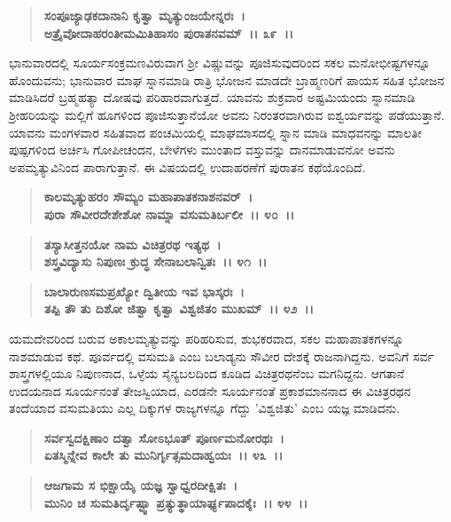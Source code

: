 \begin{verse}
\textbf{ಸಂಪೂಜ್ಯಾಢಕದಾನಾನಿ ಕೃತ್ವಾ ಮೃತ್ಯುಂಜಯೇನ್ನರಃ~।}\\\textbf{ಅತ್ರೈವೋದಾಹರಂತೀಮಮಿತಿಹಾಸಂ ಪುರಾತನವಮ್~।। ೩೯~।।}
\end{verse}

ಭಾನುವಾರದಲ್ಲಿ ಸೂರ್ಯಸಂಕ್ರಮಣವಿರುವಾಗ ಶ‍್ರೀ ವಿಷ್ಣುವನ್ನು ಪೂಜಿಸುವುದರಿಂದ ಸಕಲ ಮನೋಭೀಷ್ಟಗಳನ್ನೂ ಹೊಂದುವನು; ಭಾನುವಾರ ಮಾಘ ಸ್ನಾನಮಾಡಿ ರಾತ್ರಿ ಭೋಜನ ಮಾಡದೇ ಬ್ರಾಹ್ಮಣರಿಗೆ ಪಾಯಸ ಸಹಿತ ಭೋಜನ ಮಾಡಿಸಿದರೆ ಬ್ರಹ್ಮಹತ್ಯಾ ದೋಷವು ಪರಿಹಾರವಾಗುತ್ತದೆ. ಯಾವನು ಶುಕ್ರವಾರ ಅಷ್ಟಮಿಯಂದು ಸ್ನಾನಮಾಡಿ ಶ‍್ರೀಹರಿಯನ್ನು ಮಲ್ಲಿಗೆ ಹೂಗಳಿಂದ ಪೂಜಿಸುತ್ತಾನೆಯೋ ಅವನು ನಿರಂತರವಾಗಿರುವ ಐಶ್ವರ್ಯವನ್ನು ಪಡೆಯುತ್ತಾನೆ. ಯಾವನು ಮಂಗಳವಾರ ಸಹಿತವಾದ ಪಂಚಮಿಯಲ್ಲಿ ಮಾಘಮಾಸದಲ್ಲಿ ಸ್ನಾನ ಮಾಡಿ ಮಾಧವನನ್ನು ಮಾಲತೀ ಪುಷ್ಪಗಳಿಂದ ಅರ್ಚಿಸಿ ಗೋಪೀಚಂದನ, ಬೇಳೆಗಳು ಮುಂತಾದ ವಸ್ತುವನ್ನು ದಾನಮಾಡುವನೋ ಅವನು ಅಪಮೃತ್ಯುವಿನಿಂದ ಪಾರಾಗುತ್ತಾನೆ. ಈ ವಿಷಯದಲ್ಲಿ ಉದಾಹರಣೆಗೆ ಪುರಾತನ ಕಥೆಯೊಂದಿದೆ.

\begin{verse}
\textbf{ಕಾಲಮೃತ್ಯುಹರಂ ಸೌಮ್ಯಂ ಮಹಾಪಾತಕನಾಶನವರ್~।}\\\textbf{ಪುರಾ ಸೌವೀರದೇಶೇಶೋ ನಾಮ್ನಾ ವಸುಮತಿರ್ಬಲೀ~।। ೪೦~।। }
\end{verse}

\begin{verse}
\textbf{ತಸ್ಯಾಸೀತ್ತನಯೋ ನಾಮ ವಿಚಿತ್ರರಥ ಇತ್ಯಥ~।}\\\textbf{ಶಸ್ತ್ರವಿದ್ಯಾಸು ನಿಪುಣಃ ಕ್ರುದ್ಧ ಸೇನಾಬಲಾನ್ವಿತಃ~।। ೪೧~।।}
\end{verse}

\begin{verse}
\textbf{ಬಾಲಾರುಣಸಮಪ್ರಖ್ಯೋ ದ್ವಿತೀಯ ಇವ ಭಾಸ್ಕರಃ~।}\\\textbf{ತಪ್ಪಿ ತೌ ತು ದಿಶೋ ಜಿತ್ವಾ ಕೃತ್ವಾ ವಿಶ್ವಜಿತಂ ಮುಖಮ್~।। ೪೨~।।}
\end{verse}

ಯಮದೇವರಿಂದ ಬರುವ ಅಕಾಲಮೃತ್ಯುವನ್ನು ಪರಿಹರಿಸುವ, ಶುಭಕರವಾದ, ಸಕಲ ಮಹಾಪಾತಕಗಳನ್ನೂ ನಾಶಮಾಡುವ ಕಥೆ. ಪೂರ್ವದಲ್ಲಿ ವಸುಮತಿ ಎಂಬ ಬಲಾಡ್ಯನು ಸೌವೀರ ದೇಶಕ್ಕೆ ರಾಜನಾಗಿದ್ದನು. ಅವನಿಗೆ ಸರ್ವ ಶಾಸ್ತ್ರಗಳಲ್ಲಿಯೂ ನಿಪುಣನಾದ, ಒಳ್ಳೆಯ ಸೈನ್ಯಬಲದಿಂದ ಕೂಡಿದ ವಿಚಿತ್ರರಥನೆಂಬ ಮಗನಿದ್ದನು. ಆಗತಾನೆ ಉದಯನಾದ ಸೂರ್ಯನಂತೆ ತೇಜಸ್ವಿಯಾದ, ಎರಡನೇ ಸೂರ್ಯನಂತೆ ಪ್ರಕಾಶಮಾನನಾದ ಈ ವಿಚಿತ್ರರಥನ ತಂದೆಯಾದ ವಸುಮತಿಯು ಎಲ್ಲ ದಿಕ್ಕುಗಳ ರಾಜ್ಯಗಳನ್ನೂ ಗೆದ್ದು 'ವಿಶ್ವಜಿತು' ಎಂಬ ಯಜ್ಞ ಮಾಡಿದನು.

\begin{verse}
\textbf{ಸರ್ವಸ್ವದಕ್ಷಿಣಾಂ ದತ್ವಾ ಸೋಽಭೂತ್ ಪೂರ್ಣಮನೋರಥಃ~।}\\\textbf{ಏತಸ್ಮಿನ್ನೇವ ಕಾಲೇ ತು ಮುನಿರ್ಗೃತ್ಸಮದಾಹ್ವಯಃ~।। ೪೩~।। }
\end{verse}

\begin{verse}
\textbf{ಆಜಗಾಮ ಸ ಭಿಕ್ಷಾಯೈ ಯಜ್ಞ ಸ್ವಾಧ್ವರದೀಕ್ಷಿತಃ~।}\\\textbf{ಮುನಿಂ ಚ ಸುಮತಿರ್ದೃಷ್ಟ್ವಾ ಪ್ರತ್ಯುತ್ಥಾಯಾರ್ಘ್ಯಪಾದಕೈಃ~।। ೪೪~।। }
\end{verse}

